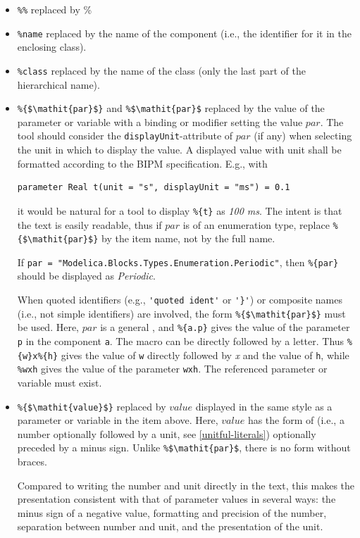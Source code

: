 \begin{itemize}
\item
  \lstinline!%%! replaced by \%
\item
  \lstinline!%name! replaced by the name of the component (i.e., the identifier for it in the enclosing class).
\item
  \lstinline[deletekeywords={[2]class}]!%
\item
  \lstinline!%{$\mathit{par}$}! and \lstinline!%$\mathit{par}$! replaced by the value of the parameter or variable with a binding or modifier setting the value $\mathit{par}$.
  The tool should consider the \lstinline!displayUnit!-attribute of $\mathit{par}$ (if any) when selecting the unit in which to display the value.
  A displayed value with unit shall be formatted according to the BIPM specification.
  E.g., with
\begin{lstlisting}[language=modelica]
parameter Real t(unit = "s", displayUnit = "ms") = 0.1
\end{lstlisting}
  it would be natural for a tool to display \lstinline!%{t}! as \emph{100 ms}.
  The intent is that the text is easily readable, thus if $\mathit{par}$ is of an enumeration type, replace \lstinline!%{$\mathit{par}$}! by the item name, not by the full name.
  \begin{example}
  If \lstinline!par = "Modelica.Blocks.Types.Enumeration.Periodic"!, then \lstinline!%{par}! should be displayed as \emph{Periodic}.
  \end{example}
  When quoted identifiers (e.g., \lstinline!'quoted ident'! or \lstinline!'}'!) or composite names (i.e., not simple identifiers) are involved, the form \lstinline!%{$\mathit{par}$}! must be used.
  Here, $\mathit{par}$ is a general , and \lstinline!%{a.p}! gives the value of the parameter \lstinline!p! in the component \lstinline!a!.
  The macro can be directly followed by a letter.
  Thus \lstinline!%{w}x%{h}! gives the value of \lstinline!w! directly followed by \emph{x} and the value of \lstinline!h!, while \lstinline!%wxh! gives the value of the parameter \lstinline!wxh!.
  The referenced parameter or variable must exist.
\item
  \lstinline!%{$\mathit{value}$}! replaced by $\mathit{value}$ displayed in the same style as a parameter or variable in the item above.
  Here, $\mathit{value}$ has the form of  (i.e., a number optionally followed by a unit, see \cref{unitful-literals}) optionally preceded by a minus sign.
  Unlike \lstinline!%$\mathit{par}$!, there is no form without braces.
  \begin{nonnormative}
  Compared to writing the number and unit directly in the text, this makes the presentation consistent with that of parameter values in several ways: the minus sign of a negative value, formatting and precision of the number, separation between number and unit, and the presentation of the unit.
  \end{nonnormative}
\end{itemize}

